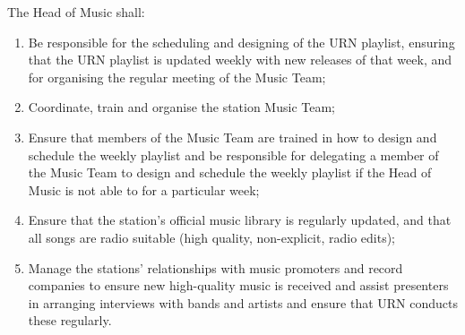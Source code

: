 \item The Head of Music shall:
\begin{enumerate}[label*=\arabic*.]
    \item Be responsible for the scheduling and designing of the URN playlist, ensuring that the URN playlist is updated weekly with new releases of that week, and for organising the regular meeting of the Music Team;
    \item Coordinate, train and organise the station Music Team;
    \item Ensure that members of the Music Team are trained in how to design and schedule the weekly playlist and be responsible for delegating a member of the Music Team to design and schedule the weekly playlist if the Head of Music is not able to for a particular week;
    \item Ensure that the station's official music library is regularly updated, and that all songs are radio suitable (high quality, non-explicit, radio edits);
    \item Manage the stations' relationships with music promoters and record companies to ensure new high-quality music is received and assist presenters in arranging interviews with bands and artists and ensure that URN conducts these regularly.
\end{enumerate}
